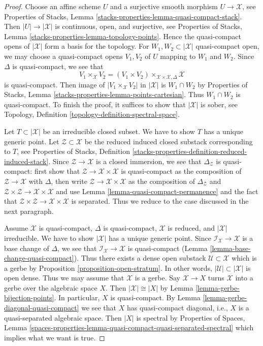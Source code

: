 \documentclass[10pt,a4paper]{amsart}
\theoremstyle{plain}
\theoremstyle{definition}
\theoremstyle{remark}
\numberwithin{equation}{subsection}
\begin{document}
\begin{proof}
Choose an affine scheme $U$ and a surjective smooth morphism
$U \to \mathcal{X}$, see
Properties of Stacks, Lemma \ref{stacks-properties-lemma-quasi-compact-stack}.
Then $|U| \to |\mathcal{X}|$ is continuous, open, and surjective, see
Properties of Stacks, Lemma \ref{stacks-properties-lemma-topology-points}.
Hence the quasi-compact opens of $|\mathcal{X}|$ form a basis
for the topology. For $W_1, W_2 \subset |\mathcal{X}|$ quasi-compact open,
we may choose a quasi-compact opens $V_1, V_2$ of $U$ mapping
to $W_1$ and $W_2$. Since $\Delta$ is quasi-compact,
we see that
$$
V_1 \times_\mathcal{X} V_2 =
(V_1 \times V_2) \times_{\mathcal{X} \times \mathcal{X}, \Delta} \mathcal{X}
$$
is quasi-compact. Then image of $|V_1 \times_\mathcal{X} V_2|$ in
$|\mathcal{X}|$ is $W_1 \cap W_2$ by
Properties of Stacks, Lemma \ref{stacks-properties-lemma-points-cartesian}.
Thus $W_1 \cap W_2$ is quasi-compact.
To finish the proof, it suffices to show that $|\mathcal{X}|$
is sober, see Topology, Definition \ref{topology-definition-spectral-space}.

\medskip\noindent
Let $T \subset |\mathcal{X}|$ be an irreducible closed subset.
We have to show $T$ has a unique generic point.
Let $\mathcal{Z} \subset \mathcal{X}$ be the reduced induced
closed substack corresponding to $T$, see
Properties of Stacks, Definition
\ref{stacks-properties-definition-reduced-induced-stack}.
Since $\mathcal{Z} \to \mathcal{X}$ is a closed immersion,
we see that $\Delta_\mathcal{Z}$ is quasi-compact:
first show that $\mathcal{Z} \to \mathcal{X} \times \mathcal{X}$
is quasi-compact as the composition of $\mathcal{Z} \to \mathcal{X}$
with $\Delta$, then write $\mathcal{Z} \to \mathcal{X} \times \mathcal{X}$
as the composition of $\Delta_\mathcal{Z}$ and
$\mathcal{Z} \times \mathcal{Z} \to \mathcal{X} \times \mathcal{X}$ and
use Lemma \ref{lemma-quasi-compact-permanence}
and the fact that
$\mathcal{Z} \times \mathcal{Z} \to \mathcal{X} \times \mathcal{X}$
is separated. Thus we reduce to the case discussed in the next
paragraph.

\medskip\noindent
Assume $\mathcal{X}$ is quasi-compact, $\Delta$ is quasi-compact,
$\mathcal{X}$ is reduced, and $|\mathcal{X}|$ irreducible.
We have to show $|\mathcal{X}|$ has a unique generic point.
Since $\mathcal{I}_\mathcal{X} \to \mathcal{X}$ is a base change of $\Delta$,
we see that $\mathcal{I}_\mathcal{X} \to \mathcal{X}$
is quasi-compact (Lemma \ref{lemma-base-change-quasi-compact}).
Thus there exists a dense open substack $\mathcal{U} \subset \mathcal{X}$
which is a gerbe by
Proposition \ref{proposition-open-stratum}.
In other words, $|\mathcal{U}| \subset |\mathcal{X}|$
is open dense. Thus we may assume that $\mathcal{X}$ is a gerbe.
Say $\mathcal{X} \to X$ turns $\mathcal{X}$ into a gerbe over the
algebraic space $X$. Then $|\mathcal{X}| \cong |X|$ by
Lemma \ref{lemma-gerbe-bijection-points}.
In particular, $X$ is quasi-compact.
By Lemma \ref{lemma-gerbe-diagonal-quasi-compact}
we see that $X$ has quasi-compact diagonal,
i.e., $X$ is a quasi-separated algebraic space.
Then $|X|$ is spectral by
Properties of Spaces, Lemma
\ref{spaces-properties-lemma-quasi-compact-quasi-separated-spectral}
which implies what we want is true.
\end{proof}
\end{document}
